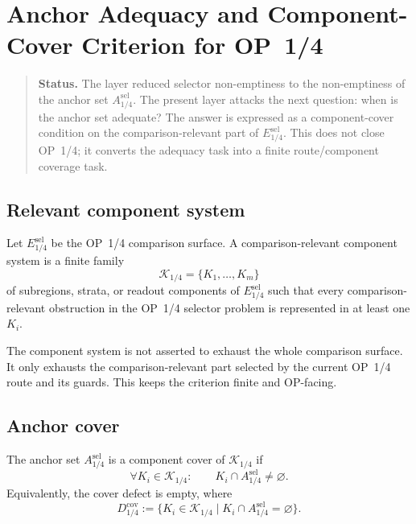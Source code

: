 \clearpage
\section{Anchor Adequacy and Component-Cover Criterion for OP~1/4}
\label{sec:v410r09-anchor-adequacy-component-cover}

\begin{quote}\small
\noindent\textbf{Status.}
The layer reduced selector non-emptiness to the non-emptiness of the anchor
set \(A_{1/4}^{\mathrm{sel}}\). The present layer attacks the next
question: when is the anchor set adequate? The answer is expressed as a
component-cover condition on the comparison-relevant part of
\(E_{1/4}^{\mathrm{sel}}\). This does not close OP~1/4; it converts the
adequacy task into a finite route/component coverage task.
\end{quote}

\subsection{Relevant component system}
\label{subsec:v410r09-relevant-component-system}

\begin{definition}
\label{def:v410r09-comparison-relevant-component-system}
Let \(E_{1/4}^{\mathrm{sel}}\) be the OP~1/4 comparison surface. A
comparison-relevant component system is a finite family
\[
 \mathcal K_{1/4}
 =
 \{K_1,\ldots,K_m\}
\]
of subregions, strata, or readout components of \(E_{1/4}^{\mathrm{sel}}\)
such that every comparison-relevant obstruction in the OP~1/4 selector problem
is represented in at least one \(K_i\).
\end{definition}

\begin{remark}
\label{rem:v410r09-why-finite-components}
The component system is not asserted to exhaust the whole comparison surface.
It only exhausts the comparison-relevant part selected by the current OP~1/4
route and its guards. This keeps the criterion finite and OP-facing.
\end{remark}

\subsection{Anchor cover}
\label{subsec:v410r09-anchor-cover}

\begin{definition}
\label{def:v410r09-anchor-cover}
The anchor set \(A_{1/4}^{\mathrm{sel}}\) is a component cover of
\(\mathcal K_{1/4}\) if
\[
 \forall K_i\in\mathcal K_{1/4}:
 \qquad
 K_i\cap A_{1/4}^{\mathrm{sel}}\neq\varnothing.
\]
Equivalently, the cover defect is empty, where
\[
 D_{1/4}^{\mathrm{cov}}
 :=
 \{K_i\in\mathcal K_{1/4}\mid
 K_i\cap A_{1/4}^{\mathrm{sel}}=\varnothing\}.
\]
\end{definition}

